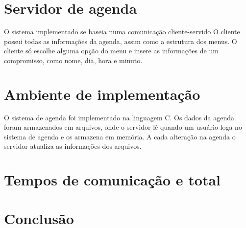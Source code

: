 \documentclass[10pt,a4paper]{article}
\begin{document}
\section{Servidor de agenda}
  O sistema implementado se baseia numa comunicação cliente-servido O cliente possui todas as informações da agenda, assim como a estrutura dos menus. O cliente só escolhe alguma opção do menu e insere as informações de um compromisso, como nome, dia, hora e minuto.

\section{Ambiente de implementação}
  O sistema de agenda foi implementado na linguagem C. Os dados da agenda foram armazenados em arquivos, onde o servidor lê quando um usuário loga no sistema de agenda e os armazena em memória. A cada alteração na agenda o servidor atualiza as informações dos arquivos.

\section{Tempos de comunicação e total}

\section{Conclusão}


\begin{small}
  
\end{small}
\end{document}
